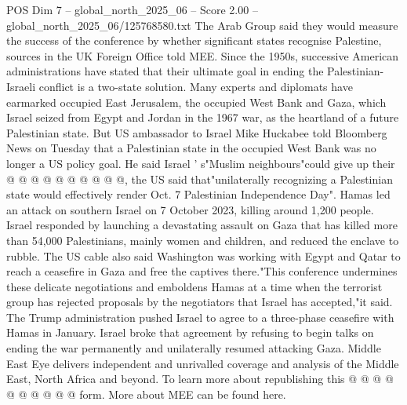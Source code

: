 \begin{textsample}{POS Dim 7 – global\_north\_2025\_06 – Score 2.00 – global\_north\_2025\_06/125768580.txt}
The Arab Group said they would measure the success of the conference by whether significant states recognise Palestine, sources in the UK Foreign Office told MEE.
Since the 1950s, successive American administrations have stated that their ultimate goal in ending the Palestinian-Israeli conflict is a two-state solution.
Many experts and diplomats have earmarked occupied East Jerusalem, the occupied West Bank and Gaza, which Israel seized from Egypt and Jordan in the 1967 war, as the heartland of a future Palestinian state.
But US ambassador to Israel Mike Huckabee told Bloomberg News on Tuesday that a Palestinian state in the occupied West Bank was no longer a US policy goal.
He said Israel ' s"Muslim neighbours"could give up their @ @ @ @ @ @ @ @ @ @, the US said that"unilaterally recognizing a Palestinian state would effectively render Oct. 7 Palestinian Independence Day".
Hamas led an attack on southern Israel on 7 October 2023, killing around 1,200 people.
Israel responded by launching a devastating assault on Gaza that has killed more than 54,000 Palestinians, mainly women and children, and reduced the enclave to rubble.
The US cable also said Washington was working with Egypt and Qatar to reach a ceasefire in Gaza and free the captives there."This conference undermines these delicate negotiations and emboldens Hamas at a time when the terrorist group has rejected proposals by the negotiators that Israel has accepted,"it said.
The Trump administration pushed Israel to agree to a three-phase ceasefire with Hamas in January.
Israel broke that agreement by refusing to begin talks on ending the war permanently and unilaterally resumed attacking Gaza.
Middle East Eye delivers independent and unrivalled coverage and analysis of the Middle East, North Africa and beyond.
To learn more about republishing this @ @ @ @ @ @ @ @ @ @ form.
More about MEE can be found here.

\end{textsample}
